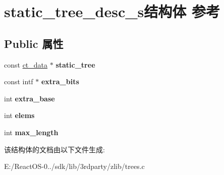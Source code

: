 \hypertarget{structstatic__tree__desc__s}{}\section{static\+\_\+tree\+\_\+desc\+\_\+s结构体 参考}
\label{structstatic__tree__desc__s}
\subsection*{Public 属性}
\begin{DoxyCompactItemize}
\item 
\mbox{\label{structstatic__tree__desc__s_a56265073858de4ffe99e32d0f9d38545}} 
const \hyperlink{structct__data}{ct\+\_\+data} $\ast$ {\bfseries static\+\_\+tree}
\item 
\mbox{\label{structstatic__tree__desc__s_a4ec9abd624cbf2bfcc48dfb786925986}} 
const intf $\ast$ {\bfseries extra\+\_\+bits}
\item 
\mbox{\label{structstatic__tree__desc__s_a1051cc83d9d410ccf21427df9bd85201}} 
int {\bfseries extra\+\_\+base}
\item 
\mbox{\label{structstatic__tree__desc__s_ab4bad1c091188c43413a09f626a5787f}} 
int {\bfseries elems}
\item 
\mbox{\label{structstatic__tree__desc__s_ae767848725194f63fa9cf08142767ad4}} 
int {\bfseries max\+\_\+length}
\end{DoxyCompactItemize}


该结构体的文档由以下文件生成\+:\begin{DoxyCompactItemize}
\item 
E\+:/\+React\+O\+S-\/0../sdk/lib/3rdparty/zlib/trees.\+c\end{DoxyCompactItemize}
